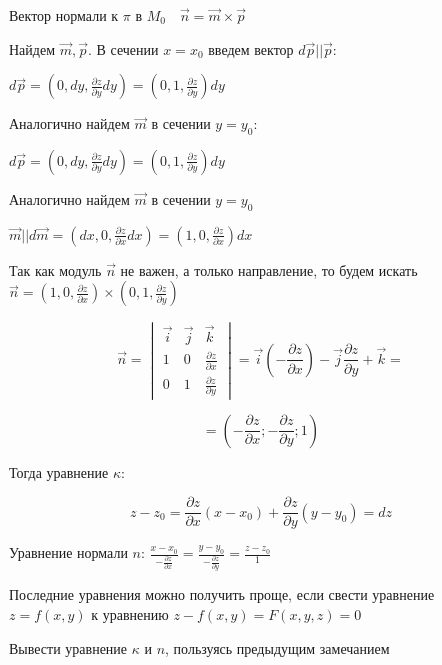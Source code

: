 \documentclass[12pt]{article}
\begin{document}
    Вектор нормали к $\pi$ в $M_0 \quad \vec{n} = \vec{m} \times \vec{p}$

    Найдем $\vec{m}, \vec{p}$. В сечении $x = x_0$ введем вектор $d\vec{p} || \vec{p}$:

    $d\vec{p} = \left(0, dy, \frac{\partial z}{\partial y}dy\right) = \left(0, 1, \frac{\partial z}{\partial y}\right) dy$

    Аналогично найдем $\vec{m}$ в сечении $y = y_0$:

    $d\overrightarrow{p} = \left(0, dy, \frac{\partial z}{\partial y}dy\right) = \left(0, 1, \frac{\partial z}{\partial y}\right) dy$

    Аналогично найдем $\overrightarrow{m}$ в сечении $y = y_0$

    $\overrightarrow{m} || d\overrightarrow{m} = \left(dx, 0, \frac{\partial z}{\partial x}dx\right) = \left(1, 0, \frac{\partial z}{\partial x}\right) dx$

    Так как модуль $\overrightarrow{n}$ не важен, а только направление, то будем искать
    $\overrightarrow{n} = \left(1, 0, \frac{\partial z}{\partial x}\right) \times \left(0, 1, \frac{\partial z}{\partial y}\right)$

    \[\overrightarrow{n} =
    \begin{vmatrix} \overrightarrow{i} & \overrightarrow{j} & \overrightarrow{k} \\
        1 & 0 & \frac{\partial z}{\partial x} \\ 0 & 1 & \frac{\partial z}{\partial y}
    \end{vmatrix} = \overrightarrow{i} \left(-\frac{\partial z}{\partial x}\right) - \overrightarrow{j} \frac{\partial z}{\partial y} + \overrightarrow{k} = \]

    \[= \left(-\frac{\partial z}{\partial x}; -\frac{\partial z}{\partial y}; 1\right)\]

    Тогда уравнение $\kappa$:

    \[z - z_0 = \frac{\partial z}{\partial x}(x - x_0) + \frac{\partial z}{\partial y} (y - y_0) = dz\]

    Уравнение нормали $n$: $\frac{x - x_0}{-\frac{\partial z}{\partial x}} = \frac{y - y_0}{-\frac{\partial z}{\partial y}} = \frac{z - z_0}{1}$

    \Nota Последние уравнения можно получить проще, если свести уравнение $z = f(x, y)$ к уравнению $z - f(x, y) = F(x, y, z) = 0$

    \Lab Вывести уравнение $\kappa$ и $n$, пользуясь предыдущим замечанием
\end{document}
